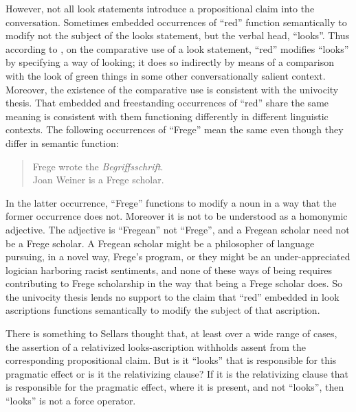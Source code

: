 \documentclass[12pt]{article}
\begin{document}
However, not all look statements introduce a propositional claim into the conversation. Sometimes embedded occurrences of ``red'' function semantically to modify not the subject of the looks statement, but the verbal head, ``looks''. Thus according to \citet[]{Chisholm:1957dq}, on the comparative use of a look statement, ``red'' modifies ``looks'' by specifying a way of looking; it does so indirectly by means of a comparison with the look of green things in some other conversationally salient context. Moreover, the existence of the comparative use is consistent with the univocity thesis. That embedded and freestanding occurrences of ``red'' share the same meaning is consistent with them functioning differently in different linguistic contexts. The following occurrences of ``Frege'' mean the same even though they differ in semantic function: 
\begin{quote}
	Frege wrote the \emph{Begriffsschrift}.\\
	Joan Weiner is a Frege scholar. 
\end{quote}
In the latter occurrence, ``Frege'' functions to modify a noun in a way that the former occurrence does not. Moreover it is not to be understood as a homonymic adjective. The adjective is ``Fregean'' not ``Frege'', and a Fregean scholar need not be a Frege scholar. A Fregean scholar might be a philosopher of language pursuing, in a novel way, Frege's program, or they might be an under-appreciated logician harboring racist sentiments, and none of these ways of being requires contributing to Frege scholarship in the way that being a Frege scholar does. So the univocity thesis lends no support to the claim that ``red'' embedded in look ascriptions functions semantically to modify the subject of that ascription.

There is something to Sellars thought that, at least over a wide range of cases, the assertion of a relativized looks-ascription withholds assent from the corresponding propositional claim. But is it ``looks'' that is responsible for this pragmatic effect or is it the relativizing clause? If it is the relativizing clause that is responsible for the pragmatic effect, where it is present, and not ``looks'', then ``looks'' is not a force operator.
\end{document}

